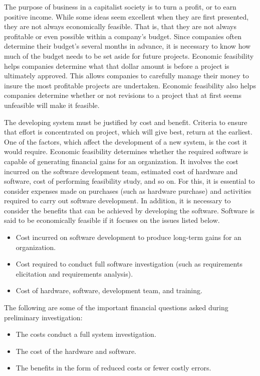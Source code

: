 The purpose of business in a capitalist society is to turn a profit, or to earn positive income. While some ideas seem excellent when they are first presented, they are not always economically feasible. That is, that they are not always profitable or even possible within a company's budget. Since companies often determine their budget's several months in advance, it is necessary to know how much of the budget needs to be set aside for future projects. Economic feasibility helps companies determine what that dollar amount is before a project is ultimately approved. This allows companies to carefully manage their money to insure the most profitable projects are undertaken. Economic feasibility also helps companies determine whether or not revisions to a project that at first seems unfeasible will make it feasible.

The developing system must be justified by cost and benefit. Criteria to ensure that effort is concentrated on project, which will give best, return at the earliest. One of the factors, which affect the development of a new system, is the cost it would require. Economic feasibility determines whether the required software is capable of generating financial gains for an organization. It involves the cost incurred on the software development team, estimated cost of hardware and software, cost of performing feasibility study, and so on. For this, it is essential to consider expenses made on purchases (such as hardware purchase) and activities required to carry out software development. In addition, it is necessary to consider the benefits that can be achieved by developing the software. Software is said to be economically feasible if it focuses on the issues listed below.
\begin{itemize}
	\item Cost incurred on software development to produce long-term gains for an organization.
	\item Cost required to conduct full software investigation (such as requirements elicitation and requirements analysis).
	\item Cost of hardware, software, development team, and training.
\end{itemize}

The following are some of the important financial questions asked during preliminary investigation:
\begin{itemize}
	\item The costs conduct a full system investigation.
	\item The cost of the hardware and software.
	\item The benefits in the form of reduced costs or fewer costly errors.
\end{itemize}

